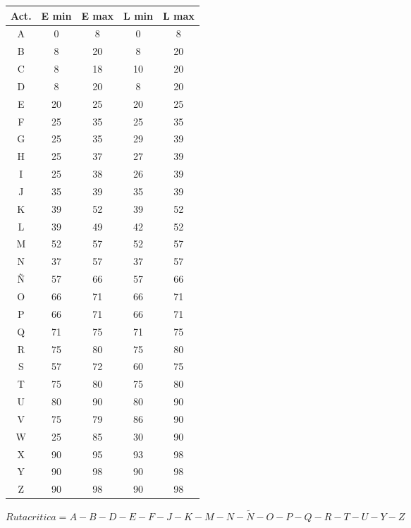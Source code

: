 \documentclass[]{article}
\begin{document}
\begin{table}[ht]
\centering
\begin{tabular}{|c|c|c|c|c|}
\hline
Act. & E min & E max & L min & L max \\ \hline
A    & 0     & 8     & 0     & 8     \\ \hline
B    & 8     & 20    & 8     & 20    \\ \hline
C    & 8     & 18    & 10    & 20    \\ \hline
D    & 8     & 20    & 8     & 20    \\ \hline
E    & 20    & 25    & 20    & 25    \\ \hline
F    & 25    & 35    & 25    & 35    \\ \hline
G    & 25    & 35    & 29    & 39    \\ \hline
H    & 25    & 37    & 27    & 39    \\ \hline
I    & 25    & 38    & 26    & 39    \\ \hline
J    & 35    & 39    & 35    & 39    \\ \hline
K    & 39    & 52    & 39    & 52    \\ \hline
L    & 39    & 49    & 42    & 52    \\ \hline
M    & 52    & 57    & 52    & 57    \\ \hline
N    & 37    & 57    & 37    & 57    \\ \hline
Ñ    & 57    & 66    & 57    & 66    \\ \hline
O    & 66    & 71    & 66    & 71    \\ \hline
P    & 66    & 71    & 66    & 71    \\ \hline
Q    & 71    & 75    & 71    & 75    \\ \hline
R    & 75    & 80    & 75    & 80    \\ \hline
S    & 57    & 72    & 60    & 75    \\ \hline
T    & 75    & 80    & 75    & 80    \\ \hline
U    & 80    & 90    & 80    & 90    \\ \hline
V    & 75    & 79    & 86    & 90    \\ \hline
W    & 25    & 85    & 30    & 90    \\ \hline
X    & 90    & 95    & 93    & 98    \\ \hline
Y    & 90    & 98    & 90    & 98    \\ \hline
Z    & 90    & 98    & 90    & 98    \\ \hline
\end{tabular}
\end{table}

$$Ruta critica = A - B - D - E - F - J - K - M - N - \tilde{N} - O - P - Q - R - T - U - Y - Z$$
\end{document}
